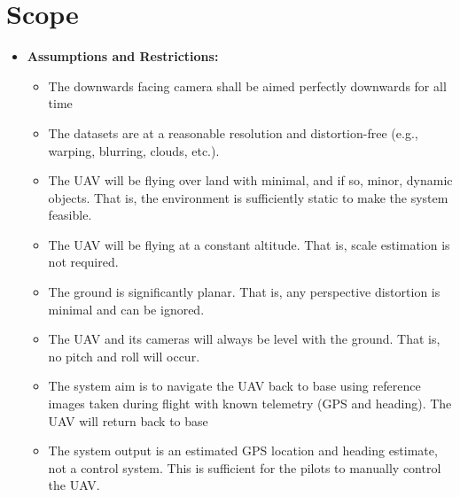 \section{Scope}
\begin{itemize}
    \item \textbf{Assumptions and Restrictions:}
    \begin{itemize}
        \item The downwards facing camera shall be aimed perfectly downwards for all time
        \item The datasets are at a reasonable resolution and distortion-free (e.g., warping, blurring, clouds, etc.).
        \item The UAV will be flying over land with minimal, and if so, minor, dynamic objects. That is, the environment is sufficiently static to make the system feasible.
        \item The UAV will be flying at a constant altitude. That is, scale estimation is not required.
        \item The ground is significantly planar. That is, any perspective distortion is minimal and can be ignored.
        \item The UAV and its cameras will always be level with the ground. That is, no pitch and roll will occur. 
        \item The system aim is to navigate the UAV back to base using reference images taken during flight with known telemetry (GPS and heading). The UAV will return back to base 
        \item The system output is an estimated GPS location and heading estimate, not a control system. This is sufficient for the pilots to manually control the UAV.
    \end{itemize}
\end{itemize}

